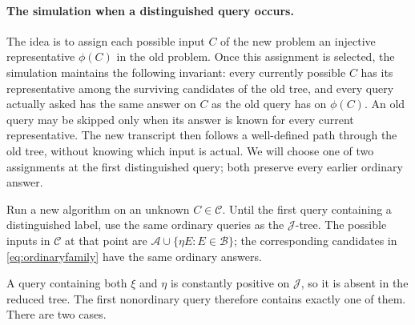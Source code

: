 \documentclass[11pt]{article}
\theoremstyle{definition}
\theoremstyle{remark}
\numberwithin{equation}{section}
\begin{document}
\paragraph{The simulation when a distinguished query occurs.}
The idea is to assign each possible input \(C\) of the new problem
an injective representative \(\phi(C)\) in the old problem.
Once this assignment is selected, the simulation maintains the
following invariant: every currently possible \(C\) has its
representative among the surviving candidates of the old tree,
and every query actually asked has the same answer on \(C\) as the
old query has on \(\phi(C)\). An old query may be skipped only when
its answer is known for every current representative. The new
transcript then follows a well-defined path through the old tree,
without knowing which input is actual. We will choose one of two
assignments at the first distinguished query; both preserve every
earlier ordinary answer.

Run a new algorithm on an unknown \(C\in\mathcal C\). Until the first
query containing a distinguished label, use the same ordinary queries
as the \(\mathcal J\)-tree. The possible inputs in \(\mathcal C\)
at that point are \(\mathcal A\cup\{\eta E:E\in\mathcal B\}\);
the corresponding candidates in \eqref{eq:ordinaryfamily} have
the same ordinary answers.

A query containing both \(\xi\) and \(\eta\) is constantly positive
on \(\mathcal J\), so it is absent in the reduced tree.
The first nonordinary query therefore contains exactly one of them.
There are two cases.
\end{document}
